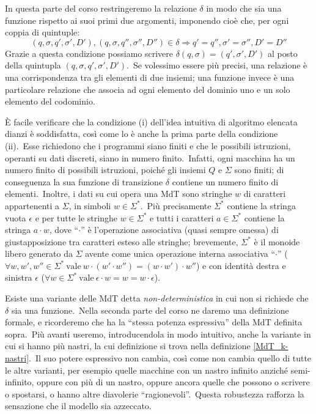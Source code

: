 \begin{definition}
\begin{itemize}
              In questa parte del corso restringeremo la relazione $\delta$ in modo che sia una funzione rispetto ai suoi primi due argomenti, imponendo cioè che, per ogni coppia di quintuple:
              \[(q,\sigma,q',\sigma',D'),(q,\sigma,q'',\sigma'',D'')\in\delta \Rightarrow q'=q'', \sigma'=\sigma'', D'=D''\]
              Grazie a questa condizione possiamo scrivere $\delta(q,\sigma)=(q', \sigma', D')$ al posto della quintupla $(q,\sigma,q',\sigma',D')$.\
              Se volessimo essere più precisi, una relazione è una corrispondenza tra gli elementi di due insiemi; una funzione invece è una particolare relazione che associa ad ogni elemento del dominio uno e un solo elemento del codominio.
    \end{itemize}
\end{definition}

\noindent È facile verificare che la condizione (i) dell'idea intuitiva di algoritmo elencata dianzi è soddisfatta, così come lo è anche la prima parte della condizione (ii).\
Esse richiedono che i programmi siano finiti e che le possibili istruzioni, operanti su dati discreti, siano in numero finito.\
Infatti, ogni macchina ha un numero finito di possibili istruzioni, poiché gli insiemi $Q$ e $\Sigma$ sono finiti; di conseguenza la sua funzione di transizione $\delta$ contiene un numero finito di elementi.\
Inoltre, i dati su cui opera una MdT sono stringhe $w$ di caratteri appartenenti a $\Sigma$, in simboli $w \in \Sigma^*$.\
Più precisamente $\Sigma^*$ contiene la stringa vuota $\epsilon$ e per tutte le stringhe $w \in \Sigma^*$ e tutti i caratteri $a \in \Sigma^*$ contiene la stringa $a\cdot w$, dove ``$\cdot$'' è l'operazione associativa (quasi sempre omessa) di giustapposizione tra caratteri esteso alle stringhe; brevemente, $\Sigma^*$ è il monoide libero generato da $\Sigma$ avente come unica operazione interna associativa ``$\cdot$'' ($\forall w, w', w'' \in \Sigma^*\ \mathrm{vale}\ w \cdot (w' \cdot w'') = (w \cdot w') \cdot w''$) e con identità destra e sinistra $\epsilon$ ($\forall w \in \Sigma^*\ \mathrm{vale}\ \epsilon \cdot w = w = w \cdot \epsilon$).

Esiste una variante delle MdT detta \textit{non-deterministica} in cui non si richiede che $\delta$ sia una funzione.\
Nella seconda parte del corso ne daremo una definizione formale, e ricorderemo che ha la ``stessa potenza espressiva'' della MdT definita sopra.\
Più avanti useremo, introducendola in modo intuitivo, anche la variante in cui si hanno più nastri, la cui definizione si trova nella definizione \ref{MdT_k-nastri}.\
Il suo potere espressivo non cambia, così come non cambia quello di tutte le altre varianti, per esempio quelle macchine con un nastro infinito anziché semi-infinito, oppure con più di un nastro, oppure ancora quelle che possono o scrivere o spostarsi, o hanno altre diavolerie ``ragionevoli''.\
Questa robustezza rafforza la sensazione che il modello sia azzeccato.\

